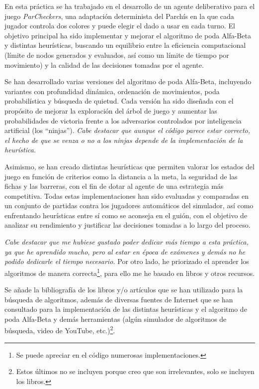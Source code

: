 En esta práctica se ha trabajado en el desarrollo de un agente deliberativo para el juego \textit{ParCheckers}, una adaptación determinista del Parchís en la que cada jugador controla dos colores y puede elegir el dado a usar en cada turno. El objetivo principal ha sido implementar y mejorar el algoritmo de poda Alfa-Beta y distintas heurísticas, buscando un equilibrio entre la eficiencia computacional (límite de nodos generados y evaluados, así como un límite de tiempo por movimiento) y la calidad de las decisiones tomadas por el agente.

Se han desarrollado varias versiones del algoritmo de poda Alfa-Beta, incluyendo variantes con profundidad dinámica, ordenación de movimientos, poda probabilística y búsqueda de quietud. Cada versión ha sido diseñada con el propósito de mejorar la exploración del árbol de juego y aumentar las probabilidades de victoria frente a los adversarios controlados por inteligencia artificial (los ``ninjas''). \textit{Cabe destacar que aunque el código parece estar correcto, el hecho de que se venza o no a los ninjas depende de la implementación de la heurística.}

Asimismo, se han creado distintas heurísticas que permiten valorar los estados del juego en función de criterios como la distancia a la meta, la seguridad de las fichas y las barreras, con el fin de dotar al agente de una estrategia más competitiva. Todas estas implementaciones han sido evaluadas y comparadas en un conjunto de partidas contra los jugadores automáticos del simulador, así como enfrentando heurísticas entre sí como se aconseja en el guión, con el objetivo de analizar su rendimiento y justificar las decisiones tomadas a lo largo del proceso.

\textit{Cabe destacar que me hubiese gustado poder dedicar más tiempo a esta práctica, ya que he aprendido mucho, pero al estar en época de exámenes y demás no he podido dedicarle el tiempo necesario.} Por otro lado, he priorizado el aprender los algoritmos de manera correcta\footnote{Se puede apreciar en el código numerosas implementaciones.}, para ello me he basado en libros y otros recursos.

Se añade la bibliografía de los libros y/o artículos que se han utilizado para la búsqueda de algoritmos, además de diversas fuentes de Internet que se han consultado para la implementación de las distintas heurísticas y el algoritmo de poda Alfa-Beta y demás herramientas (algún simulador de algoritmos de búsqueda, video de YouTube, etc.)\footnote{Estos últimos no se incluyen porque creo que son irrelevantes, solo se incluyen los libros.}.